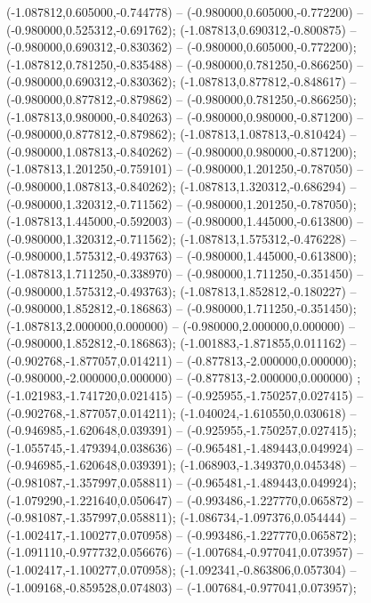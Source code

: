  (-1.087812,0.605000,-0.744778) -- (-0.980000,0.605000,-0.772200) -- (-0.980000,0.525312,-0.691762);
 (-1.087813,0.690312,-0.800875) -- (-0.980000,0.690312,-0.830362) -- (-0.980000,0.605000,-0.772200);
 (-1.087812,0.781250,-0.835488) -- (-0.980000,0.781250,-0.866250) -- (-0.980000,0.690312,-0.830362);
 (-1.087813,0.877812,-0.848617) -- (-0.980000,0.877812,-0.879862) -- (-0.980000,0.781250,-0.866250);
 (-1.087813,0.980000,-0.840263) -- (-0.980000,0.980000,-0.871200) -- (-0.980000,0.877812,-0.879862);
 (-1.087813,1.087813,-0.810424) -- (-0.980000,1.087813,-0.840262) -- (-0.980000,0.980000,-0.871200);
 (-1.087813,1.201250,-0.759101) -- (-0.980000,1.201250,-0.787050) -- (-0.980000,1.087813,-0.840262);
 (-1.087813,1.320312,-0.686294) -- (-0.980000,1.320312,-0.711562) -- (-0.980000,1.201250,-0.787050);
 (-1.087813,1.445000,-0.592003) -- (-0.980000,1.445000,-0.613800) -- (-0.980000,1.320312,-0.711562);
 (-1.087813,1.575312,-0.476228) -- (-0.980000,1.575312,-0.493763) -- (-0.980000,1.445000,-0.613800);
 (-1.087813,1.711250,-0.338970) -- (-0.980000,1.711250,-0.351450) -- (-0.980000,1.575312,-0.493763);
 (-1.087813,1.852812,-0.180227) -- (-0.980000,1.852812,-0.186863) -- (-0.980000,1.711250,-0.351450);
 (-1.087813,2.000000,0.000000) -- (-0.980000,2.000000,0.000000) -- (-0.980000,1.852812,-0.186863);
 (-1.001883,-1.871855,0.011162) -- (-0.902768,-1.877057,0.014211) -- (-0.877813,-2.000000,0.000000);
 (-0.980000,-2.000000,0.000000) -- (-0.877813,-2.000000,0.000000) ;
 (-1.021983,-1.741720,0.021415) -- (-0.925955,-1.750257,0.027415) -- (-0.902768,-1.877057,0.014211);
 (-1.040024,-1.610550,0.030618) -- (-0.946985,-1.620648,0.039391) -- (-0.925955,-1.750257,0.027415);
 (-1.055745,-1.479394,0.038636) -- (-0.965481,-1.489443,0.049924) -- (-0.946985,-1.620648,0.039391);
 (-1.068903,-1.349370,0.045348) -- (-0.981087,-1.357997,0.058811) -- (-0.965481,-1.489443,0.049924);
 (-1.079290,-1.221640,0.050647) -- (-0.993486,-1.227770,0.065872) -- (-0.981087,-1.357997,0.058811);
 (-1.086734,-1.097376,0.054444) -- (-1.002417,-1.100277,0.070958) -- (-0.993486,-1.227770,0.065872);
 (-1.091110,-0.977732,0.056676) -- (-1.007684,-0.977041,0.073957) -- (-1.002417,-1.100277,0.070958);
 (-1.092341,-0.863806,0.057304) -- (-1.009168,-0.859528,0.074803) -- (-1.007684,-0.977041,0.073957);

